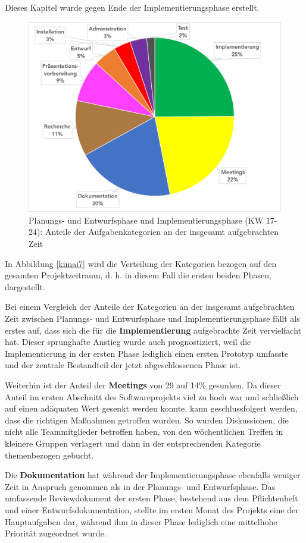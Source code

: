 \documentclass[../review_3.tex]{subfiles}
\begin{document}
Dieses Kapitel wurde gegen Ende der Implementierungsphase erstellt.

\begin{figure} [h]
    \centering
    \includegraphics[width = 0.8\linewidth]{img/kimai6.pdf}
    \caption{Planungs- und Entwurfsphase und Implementierungsphase (KW 17-24): Anteile der Aufgabenkategorien an der insgesamt aufgebrachten Zeit}
    \label{kimai6}
\end{figure}
In Abbildung \ref{kimai7} wird die Verteilung der Kategorien bezogen auf den gesamten Projektzeitraum, d. h. in diesem Fall die ersten beiden Phasen, dargestellt.

Bei einem Vergleich der Anteile der Kategorien an der insgesamt aufgebrachten Zeit zwischen Planungs- und Entwurfsphase und Implementierungsphase fällt als erstes auf, dass sich die für die \textbf{Implementierung} aufgebrachte Zeit vervielfacht hat. Dieser sprunghafte Anstieg wurde auch prognostiziert, weil die Implementierung in der ersten Phase lediglich einen ersten Prototyp umfasste und der zentrale Bestandteil der jetzt abgeschlossenen Phase ist.

Weiterhin ist der Anteil der \textbf{Meetings} von 29 auf 14\% gesunken. Da dieser Anteil im ersten Abschnitt des Softwareprojekts viel zu hoch war und schließlich auf einen adäquaten Wert gesenkt werden konnte, kann geschlussfolgert werden, dass die richtigen Maßnahmen getroffen wurden. So wurden Diskussionen, die nicht alle Teammitglieder betroffen haben, von den wöchentlichen Treffen in kleinere Gruppen verlagert und dann in der entsprechenden Kategorie themenbezogen gebucht.

Die \textbf{Dokumentation} hat während der Implementierungsphase ebenfalls weniger Zeit in Anspruch genommen als in der Planungs- und Entwurfsphase. Das umfassende Reviewdokument der ersten Phase, bestehend aus dem Pflichtenheft und einer Entwurfsdokumentation, stellte im ersten Monat des Projekts eine der Hauptaufgaben dar, während ihm in dieser Phase lediglich eine mittelhohe Priorität zugeordnet wurde.
\end{document}
